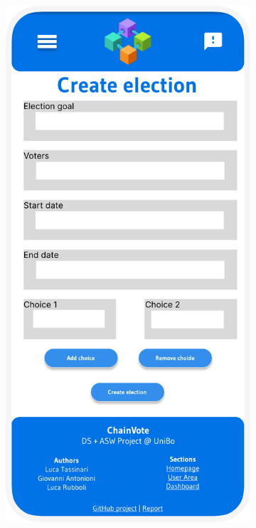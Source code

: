 \documentclass{scrartcl}
\begin{document}
\begin{figure}[h]
\begin{subfigure}[b]{0.3\textwidth}
    \end{subfigure}
    \hfill
    \begin{subfigure}[b]{0.3\textwidth}
        \centering
        \includegraphics[width=\textwidth]{./figures/mockups/create-election.pdf}

\end{subfigure}
\end{figure}
\end{document}
